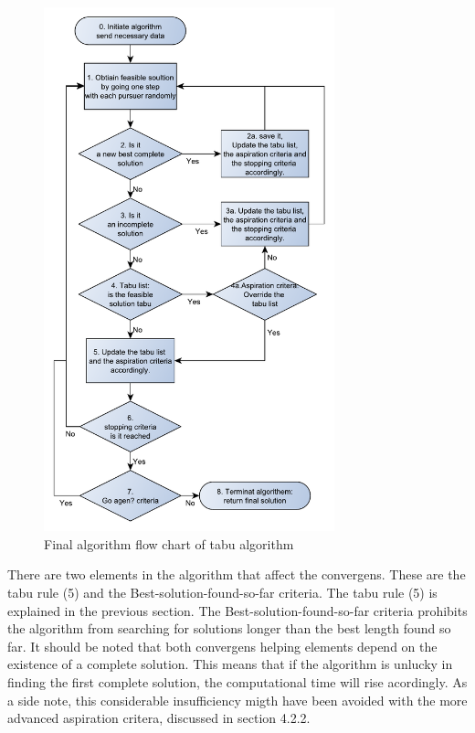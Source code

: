 \begin{figure}[!h]
	\centering
	\includegraphics[width=0.75\textwidth,height=0.70\textheight]{chapter_4_methods/ny_Tabu}
  	\caption[Final algorithm flow chart of tabu algorithm]
  	{Final algorithm flow chart of tabu algorithm}
	\label{t2}
\end{figure}


There are two elements in the algorithm that affect the convergens. These are the tabu rule (5) and the Best-solution-found-so-far criteria. The tabu rule (5) is explained in the previous section. The Best-solution-found-so-far criteria prohibits the algorithm from searching for solutions longer than the best length found so far. It should be noted that both convergens helping elements depend on the existence of a complete solution. This means that if the algorithm is unlucky in finding the first complete solution, the computational time will rise acordingly. As a side note, this considerable insufficiency migth have been avoided with the more advanced aspiration critera, discussed in section 4.2.2.

